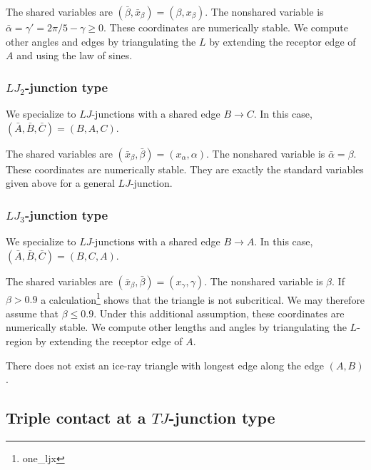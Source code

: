The shared variables are $(\bar \beta,\bar x_\beta)=(\beta,x_\beta)$.
The nonshared variable is $\bar\alpha=\gamma' = 2\pi/5-\gamma\ge0$.
These coordinates are numerically stable.  We compute other angles and
edges by triangulating the $L$ by extending the receptor edge of $A$
and using the law of sines.


\subsubsection{$LJ_2$-junction type}

We specialize to $LJ$-junctions with a shared edge $B\to C$.
In this case, $(\bar A,\bar B,\bar C)=(B,A,C)$.

The shared variables are $(\bar x_\beta,\bar\beta)=(x_\alpha,\alpha)$.
The nonshared variable is $\bar\alpha=\beta$.  These coordinates are
numerically stable.  They are exactly the standard variables given
above for a general $LJ$-junction.


\subsubsection{$LJ_3$-junction type}

We specialize to $LJ$-junctions with a shared edge $B\to A$.
In this case, $(\bar A,\bar B,\bar C)=(B,C,A)$.

The shared variables are $(\bar x_\beta,\bar\beta)=(x_\gamma,\gamma)$.
The nonshared variable is $\beta$.  If $\beta > 0.9$ a
calculation\footnote{one\_ljx} shows that the triangle is not
subcritical.  We may therefore assume that $\beta\le 0.9$.  Under this
additional assumption, these coordinates are numerically stable.  We
compute other lengths and angles by triangulating the $L$-region by
extending the receptor edge of $A$.

There does not exist an ice-ray triangle with longest edge along the
edge $(A,B)$.


\subsection{Triple contact at a $TJ$-junction type}

